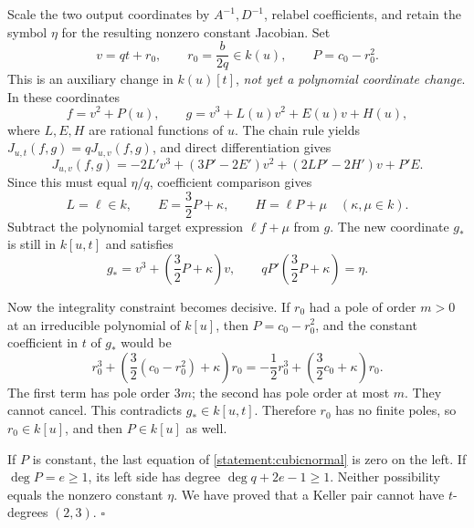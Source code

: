 \documentclass[11pt]{article}
\begin{document}
Scale the two output coordinates by $A^{-1},D^{-1}$, relabel coefficients,
and retain the symbol $\eta$ for the resulting nonzero constant Jacobian.
Set
\[
 v=qt+r_0,\qquad r_0=\frac{b}{2q}\in k(u),\qquad
 P=c_0-r_0^2.
\]
This is an auxiliary change in $k(u)[t]$, \emph{not yet a polynomial
coordinate change}. In these coordinates
\[
 f=v^2+P(u),\qquad
 g=v^3+L(u)v^2+E(u)v+H(u),
\]
where $L,E,H$ are rational functions of $u$. The chain rule yields
$J_{u,t}(f,g)=qJ_{u,v}(f,g)$, and direct differentiation gives
\begin{equation}\label{statement:cubiccompare}
 J_{u,v}(f,g)=
 -2L'v^3+(3P'-2E')v^2+(2LP'-2H')v+P'E.
\end{equation}
Since this must equal $\eta/q$, coefficient comparison gives
\[
 L=\ell\in k,\qquad E=\frac32P+\kappa,\qquad
 H=\ell P+\mu\quad(\kappa,\mu\in k).
\]
Subtract the polynomial target expression $\ell f+\mu$ from $g$. The new
coordinate $g_*$ is still in $k[u,t]$ and satisfies
\begin{equation}\label{statement:cubicnormal}
 g_*=v^3+\left(\frac32P+\kappa\right)v,
 \qquad qP'\left(\frac32P+\kappa\right)=\eta.
\end{equation}

Now the integrality constraint becomes decisive. If $r_0$ had a pole of
order $m>0$ at an irreducible polynomial of $k[u]$, then
$P=c_0-r_0^2$, and the constant coefficient in $t$ of $g_*$ would be
\begin{equation}\label{statement:pole}
 r_0^3+\left(\frac32(c_0-r_0^2)+\kappa\right)r_0
 =-\frac12r_0^3+\left(\frac32c_0+\kappa\right)r_0.
\end{equation}
The first term has pole order $3m$; the second has pole order at most $m$.
They cannot cancel. This contradicts $g_*\in k[u,t]$. Therefore $r_0$ has
no finite poles, so $r_0\in k[u]$, and then $P\in k[u]$ as well.

If $P$ is constant, the last equation of \eqref{statement:cubicnormal} is zero
on the left. If $\deg P=e\ge1$, its left side has degree
$\deg q+2e-1\ge1$. Neither possibility equals the nonzero constant $\eta$.
We have proved that a Keller pair cannot have $t$-degrees $(2,3)$.
\hfill$\square$
\end{document}
